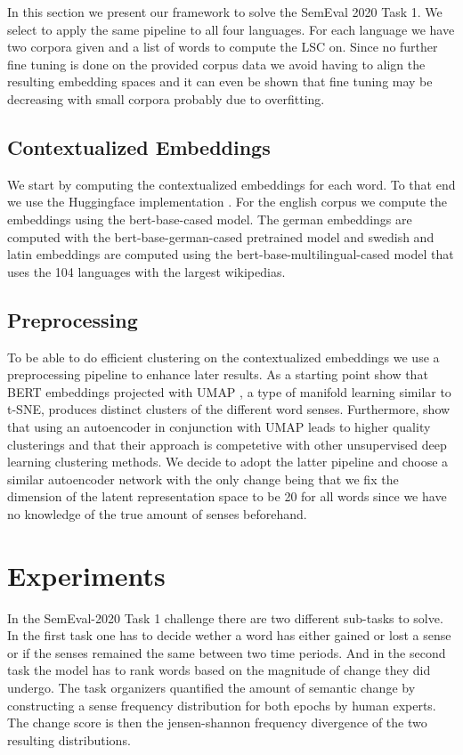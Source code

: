 \documentclass[11pt]{article}
\begin{document}
In this section we present our framework to solve the SemEval 2020 Task 1. 
We select to apply the same pipeline to all four languages. For each language we have two corpora
given and a list of words to compute the LSC on. Since no further fine tuning is done on the provided 
corpus data we avoid having to align the resulting embedding spaces and it can even be shown that fine tuning may be decreasing
with small corpora \cite{giulianelli2019lexical} probably due to overfitting. 

\subsection{Contextualized Embeddings}

We start by computing the contextualized embeddings for each word. To that end we use 
the Huggingface implementation \cite{Wolf2019HuggingFacesTS}. For the english corpus we compute the embeddings using the
bert-base-cased model. The german embeddings are computed with the bert-base-german-cased
pretrained model and swedish and latin embeddings are computed using the bert-base-multilingual-cased model that uses the 104 languages with the largest wikipedias.

\subsection{Preprocessing}

To be able to do efficient clustering on the contextualized embeddings we use a preprocessing pipeline to
enhance later results. 
As a starting point \cite{reif2019visualizing} show that BERT embeddings projected with UMAP \cite{mcinnes2018umap}, a type of manifold learning similar to t-SNE,
produces distinct clusters of the different word senses. 
Furthermore, \cite{mcconville2019n2d} show that using an autoencoder in conjunction with UMAP
leads to higher quality clusterings and that their approach is competetive with other unsupervised deep learning clustering methods.
We decide to adopt the latter pipeline and choose a similar autoencoder network with the only change being that we fix the dimension of the latent representation space to be 20 for all words
since we have no knowledge of the true amount of senses beforehand.


\section{Experiments}

In the SemEval-2020 Task 1 challenge there are two different sub-tasks to solve. 
In the first task one has to decide wether a word has either gained or lost a sense or 
if the senses remained the same between two time periods. And in the second task the model 
has to rank words based on the magnitude of change they did undergo. 
The task organizers quantified the amount of semantic change by constructing a sense frequency distribution
for both epochs by human experts. The change score is then the jensen-shannon frequency divergence of the two resulting distributions.
\end{document}
